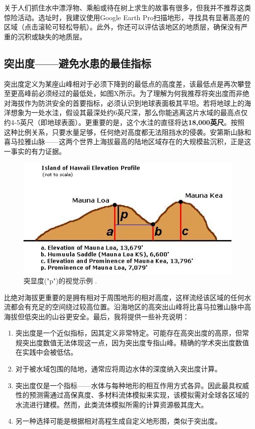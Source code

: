 \documentclass[10pt,twocolumn,letterpaper]{article}
\begin{document}
关于人们抓住水中漂浮物、乘船或待在树上求生的故事有很多，但我并不推荐这类惊险活动。选址时，我建议使用Google Earth Pro扫描地形，寻找具有显著高差的区域（点击滚轮可轻松导航）。此外，你还可以评估该地区的地质层，确保没有严重的沉积或缺失的地质层。
\subsection{突出度——避免水患的最佳指标}

突出度定义为某座山峰相对于必须下降到的最低点的高度差，该最低点是再次攀登至更高峰前必须经过的最低处，如图X所示。为了理解为何我推荐将突出度而非绝对海拔作为防洪安全的首要指标，必须认识到地球表面极其平坦。若将地球上的海洋想象为一处水洼，假设其最深处约6英尺深，那么你能逃离这片水域的最高点仅约4-5英尺（即地球表面）。更重要的是，这个水洼的直径将达\textbf{18,000英尺}。按照这种比例关系，只要水量足够，任何绝对高度都无法阻挡水的侵袭。安第斯山脉和喜马拉雅山脉——这两个世界上海拔最高的陆地区域存在的大规模盐沉积，正是这一事实的有力证据。

\begin{figure}[t]
\begin{center}
   \includegraphics[width=1\linewidth]{prominence.jpeg}
\end{center}
   \caption{突显度("p")的视觉示例 \cite{53}.}
\label{fig:11}
\label{fig:onecol}
\end{figure}

比绝对海拔更重要的是拥有相对于周围地形的相对高度，这样流经该区域的任何水流都会有充足的空间绕过较高位置。沿海地区的高突出山峰将比喜马拉雅山脉中高海拔但低突出的山谷更安全。最后，我将提供一些补充说明：
\begin{flushleft}
\begin{enumerate}
    \item 突出度是一个近似指标，因其定义非常特定。可能存在高突出度的高原，但常规突出度数值无法体现这一点，因为突出度专指山峰。精确的学术突出度数值在实践中会被低估。
    \item 对于被水域包围的陆地，通常应将周边水体的深度纳入突出度计算。
    \item 突出度仅是一个指标——水体与每种地形的相互作用方式各异。因此最具权威性的预测需通过高保真度、多材料流体模拟来实现，该模拟需对全球各区域的水流进行建模。然而，此类流体模拟所需的计算资源极其庞大。
    \item 另一种选择可能是根据相对高程生成自定义地形图，类似于突出度。
\end{enumerate}
\end{flushleft}
\end{document}
